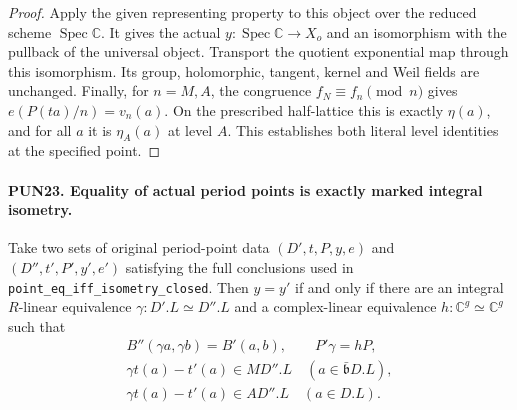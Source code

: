 \begin{proof}
Apply the given representing property to this object over
the reduced scheme \(\operatorname{Spec}\mathbb C\).
It gives the actual \(y:\operatorname{Spec}\mathbb C\to X_o\)
and an isomorphism with the pullback of the universal object.
Transport the quotient exponential map through this
isomorphism.  Its group, holomorphic, tangent, kernel and
Weil fields are unchanged.  Finally, for \(n=M,A\), the
congruence \(f_N\equiv f_n\pmod n\) gives
\(e(P(t a)/n)=v_n(a)\).  On the prescribed half-lattice
this is exactly \(\eta(a)\), and for all \(a\) it is
\(\eta_A(a)\) at level \(A\).  This establishes both
literal level identities at the specified point.
\end{proof}

\paragraph{PUN23. Equality of actual period points is exactly marked integral isometry.}
\label{claim:PUN23}
Take two sets of original period-point data
\((D',t,P,y,e)\) and \((D'',t',P',y',e')\) satisfying the
full conclusions used in \texttt{point\_eq\_iff\_isometry\_closed}.
Then \(y=y'\) if and only if there are an integral
\(R\)-linear equivalence \(\gamma:D'.L\simeq D''.L\)
and a complex-linear equivalence \(h:\mathbb C^g\simeq\mathbb C^g\)
such that
\[
 \begin{gathered}
 B''(\gamma a,\gamma b)=B'(a,b),\qquad P'\gamma=hP,\\
 \gamma t(a)-t'(a)\in MD''.L\quad(a\in\bar{\mathfrak b}D.L),\\
 \gamma t(a)-t'(a)\in AD''.L\quad(a\in D.L).
 \end{gathered}                                                   \tag{PUN.41}
\]

